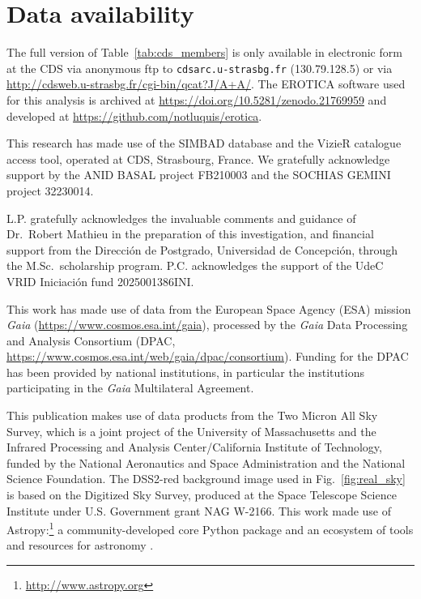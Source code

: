 \documentclass{aa}
\begin{document}
\section*{Data availability}
The full version of Table~\ref{tab:cds_members} is only available in electronic form at the CDS via anonymous ftp to \texttt{cdsarc.u-strasbg.fr} (130.79.128.5) or via \url{http://cdsweb.u-strasbg.fr/cgi-bin/qcat?J/A+A/}. The EROTICA software used for this analysis is archived at \url{https://doi.org/10.5281/zenodo.21769959} and developed at \url{https://github.com/notluquis/erotica}.

\begin{acknowledgements}
This research has made use of the SIMBAD database and the VizieR catalogue access tool, operated at CDS, Strasbourg, France. We gratefully acknowledge support by the ANID BASAL project FB210003 and the SOCHIAS GEMINI project 32230014.

L.P. gratefully acknowledges the invaluable comments and guidance of Dr.\ Robert Mathieu in the preparation of this investigation, and financial support from the Dirección de Postgrado, Universidad de Concepción, through the M.Sc.\ scholarship program. P.C. acknowledges the support of the UdeC VRID Iniciación fund 2025001386INI\@.

This work has made use of data from the European Space Agency (ESA) mission \textit{Gaia} (\url{https://www.cosmos.esa.int/gaia}), processed by the \textit{Gaia} Data Processing and Analysis Consortium (DPAC, \url{https://www.cosmos.esa.int/web/gaia/dpac/consortium}). Funding for the DPAC has been provided by national institutions, in particular the institutions participating in the \textit{Gaia} Multilateral Agreement. 

This publication makes use of data products from the Two Micron All Sky Survey, which is a joint project of the University of Massachusetts and the Infrared Processing and Analysis Center/California Institute of Technology, funded by the National Aeronautics and Space Administration and the National Science Foundation. The DSS2-red background image used in Fig.~\ref{fig:real_sky} is based on the Digitized Sky Survey, produced at the Space Telescope Science Institute under U.S. Government grant NAG W-2166. This work made use of Astropy:\footnote{\url{http://www.astropy.org}} a community-developed core Python package and an ecosystem of tools and resources for astronomy \citep{astropy:2013, astropy:2018, astropy:2022}.
\end{acknowledgements}
\end{document}
